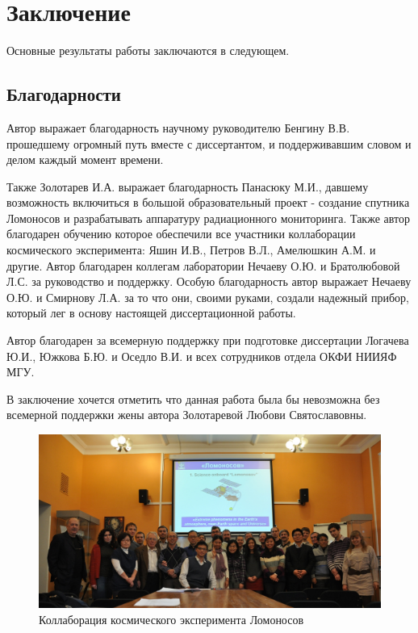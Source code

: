 \chapter*{Заключение}						%


Основные результаты работы заключаются в следующем.

\section{Благодарности}
Автор выражает благодарность научному руководителю Бенгину В.В. прошедшему огромный путь вместе с диссертантом, и поддерживавшим словом и делом каждый момент времени. 

Также Золотарев И.А. выражает благодарность Панасюку М.И., давшему возможность включиться в большой образовательный проект - создание спутника Ломоносов и разрабатывать аппаратуру радиационного мониторинга. Также автор благодарен обучению которое обеспечили  все участники коллаборации космического эксперимента: Яшин И.В., Петров В.Л., Амелюшкин А.М. и другие.  Автор благодарен коллегам  лаборатории Нечаеву О.Ю. и Братолюбовой Л.С. за руководство и поддержку. Особую благодарность автор выражает Нечаеву О.Ю. и Смирнову Л.А. за то что они,  своими руками, создали надежный прибор, который лег в основу настоящей диссертационной работы.

Автор благодарен за всемерную поддержку при подготовке диссертации Логачева Ю.И., Южкова Б.Ю. и Оседло В.И. и всех сотрудников отдела ОКФИ НИИЯФ МГУ.  

В заключение хочется отметить что данная работа была бы невозможна без всемерной поддержки жены автора Золотаревой Любови Святославовны.

\begin{figure}
	\centering
	\includegraphics[width=0.7\linewidth]{images/collab}
	\caption{Коллаборация космического эксперимента Ломоносов}
	\label{fig:collab}
\end{figure}
